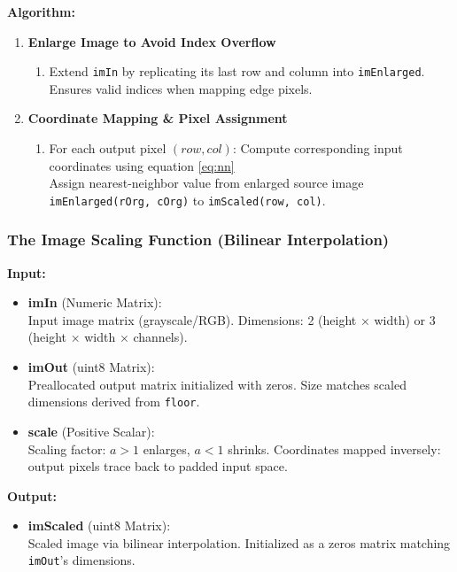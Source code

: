 \documentclass[a4paper,11pt]{article}
\begin{document}
\textbf{Algorithm:}
\begin{enumerate}
\item \textbf{Enlarge Image to Avoid Index Overflow}
    \begin{enumerate}
        \item Extend \texttt{imIn} by replicating its last row and column into \texttt{imEnlarged}. Ensures valid indices when mapping edge pixels.
    \end{enumerate}
\item \textbf{Coordinate Mapping \& Pixel Assignment}
    \begin{enumerate}
        \item For each output pixel \((row, col)\):
            Compute corresponding input coordinates using equation \ref{eq:nn}\\
            Assign nearest-neighbor value from enlarged source image \texttt{imEnlarged(rOrg, cOrg)} to \texttt{imScaled(row, col)}.\\
    \end{enumerate}
\end{enumerate}


\subsubsection{The Image Scaling Function (Bilinear Interpolation)}
\textbf{Input:}
\begin{itemize}
    \item \textbf{imIn} (Numeric Matrix):\\
        Input image matrix (grayscale/RGB). Dimensions: 2 (height $\times$ width) or 3 (height $\times$ width $\times$ channels).
    \item \textbf{imOut} (uint8 Matrix):\\
        Preallocated output matrix initialized with zeros. Size matches scaled dimensions derived from \texttt{floor}.
    \item \textbf{scale} (Positive Scalar):\\
        Scaling factor: $a > 1$ enlarges, $a < 1$ shrinks. Coordinates mapped inversely: output pixels trace back to padded input space.
\end{itemize}

\textbf{Output:}
\begin{itemize}
    \item \textbf{imScaled} (uint8 Matrix):\\
        Scaled image via bilinear interpolation. Initialized as a zeros matrix matching \texttt{imOut}'s dimensions.
\end{itemize}
\end{document}
